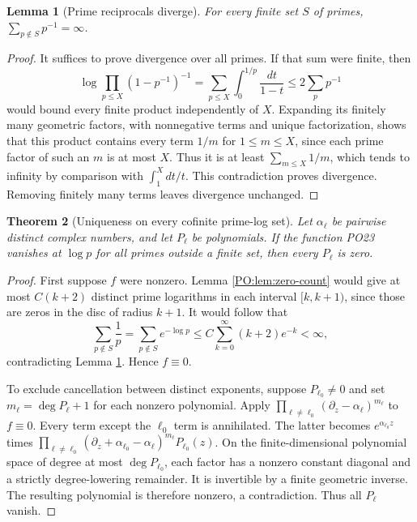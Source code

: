 \documentclass[11pt,a4paper]{article}
\newtheorem{theorem}{Theorem}[section]
\newtheorem{lemma}[theorem]{Lemma}
\theoremstyle{definition}\newtheorem{definition}[theorem]{Definition}
\begin{document}
\begin{lemma}[Prime reciprocals diverge]\label{PO:lem:Euler}
For every finite set \(S\) of primes,
\(\sum_{p\notin S}p^{-1}=\infty\).
\end{lemma}
\begin{proof}
It suffices to prove divergence over all primes.
If that sum were finite, then
\[
 \log\prod_{p\le X}(1-p^{-1})^{-1}
  =\sum_{p\le X}\int_0^{1/p}\frac{dt}{1-t}
  \le2\sum_p p^{-1}
 \tag{PO25}
\]
would bound every finite product independently of \(X\).
Expanding its finitely many geometric factors, with nonnegative
terms and unique factorization, shows that this product contains
every term \(1/m\) for \(1\le m\le X\), since each prime factor
of such an \(m\) is at most \(X\).
Thus it is at least \(\sum_{m\le X}1/m\), which tends to
infinity by comparison with \(\int_1^X dt/t\).
This contradiction proves divergence. Removing finitely many
terms leaves divergence unchanged.
\end{proof}

\begin{theorem}[Uniqueness on every cofinite prime-log set]
\label{PO:thm:prime-uniqueness}
Let \(\alpha_\ell\) be pairwise distinct complex numbers,
and let \(P_\ell\) be polynomials. If the function PO23
vanishes at \(\log p\) for all primes outside a finite set,
then every \(P_\ell\) is zero.
\end{theorem}
\begin{proof}
First suppose \(f\) were nonzero. Lemma \ref{PO:lem:zero-count}
would give at most \(C(k+2)\) distinct prime logarithms in
each interval \([k,k+1)\), since those are zeros in the disc
of radius \(k+1\).
It would follow that
\[
 \sum_{p\notin S}\frac1p
   =\sum_{p\notin S}e^{-\log p}
   \le C\sum_{k=0}^\infty(k+2)e^{-k}<\infty,
 \tag{PO26}
\]
contradicting Lemma \ref{PO:lem:Euler}. Hence \(f\equiv0\).

To exclude cancellation between distinct exponents, suppose
\(P_{\ell_0}\ne0\) and set
\(m_\ell=\deg P_\ell+1\) for each nonzero polynomial.
Apply
\(\prod_{\ell\ne\ell_0}(\partial_z-\alpha_\ell)^{m_\ell}\)
to \(f\equiv0\). Every term except the \(\ell_0\) term is
annihilated. The latter becomes \(e^{\alpha_{\ell_0}z}\)
times
\(\prod_{\ell\ne\ell_0}
  (\partial_z+\alpha_{\ell_0}-\alpha_\ell)^{m_\ell}
    P_{\ell_0}(z)\).
On the finite-dimensional polynomial space of degree at most
\(\deg P_{\ell_0}\), each factor has a nonzero constant
diagonal and a strictly degree-lowering remainder. It is
invertible by a finite geometric inverse. The resulting
polynomial is therefore nonzero, a contradiction.
Thus all \(P_\ell\) vanish.
\end{proof}
\end{document}
